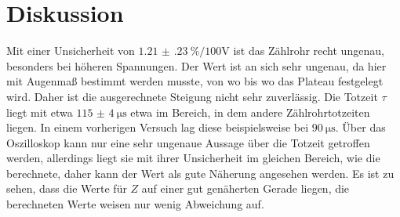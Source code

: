 \section{Diskussion}
\label{sec:Diskussion}


Mit einer Unsicherheit von $\SI{1.21(23)}{\%\per100\volt}$ ist das Zählrohr recht ungenau, besonders bei höheren Spannungen.
Der Wert ist an sich sehr ungenau, da hier mit Augenmaß bestimmt werden musste, von wo bis wo das Plateau festgelegt wird.
Daher ist die ausgerechnete Steigung nicht sehr zuverlässig.
Die Totzeit $\tau$ liegt mit etwa $\SI{115(4)}{\micro\second}$ etwa im Bereich, in dem andere Zählrohrtotzeiten liegen. In einem vorherigen Versuch lag diese beispielsweise bei $\SI{90}{\micro\second}$. \cite{V603}
Über das Oszilloskop kann nur eine sehr ungenaue Aussage über die Totzeit getroffen werden, allerdings liegt sie mit ihrer Unsicherheit im gleichen Bereich, wie die berechnete, daher kann der Wert als gute Näherung angesehen werden.
Es ist zu sehen, dass die Werte für $Z$ auf einer gut genäherten Gerade liegen, die berechneten Werte weisen nur wenig Abweichung auf.